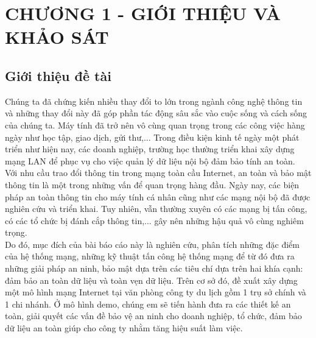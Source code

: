 \documentclass[a4paper, 12pt]{article}
\begin{document}
\section*{CHƯƠNG 1 - GIỚI THIỆU VÀ KHẢO SÁT}

\setcounter{section}{1}
\setcounter{subsection}{0}
\setcounter{figure}{0}
\setcounter{table}{0}
\subsection{Giới thiệu đề tài}
\hspace*{1cm}Chúng ta đã chứng kiến nhiều thay đổi to lớn trong ngành công nghệ thông tin và những thay đổi này đã góp phần tác động sâu sắc vào cuộc sống và cách sống của chúng ta. Máy tính đã trở nên vô cùng quan trọng trong các công việc hàng ngày như học tập, giao dịch, gửi thư,... Trong điều kiện kinh tế ngày một phát triển như hiện nay, các doanh nghiệp, trường học thường triển khai xây dựng mạng LAN để phục vụ cho việc quản lý dữ liệu nội bộ đảm bảo tính an toàn.\\
\hspace*{1cm}Với nhu cầu trao đổi thông tin trong mạng toàn cầu Internet, an toàn và bảo mật thông tin là một trong những vấn để quan trọng hàng đầu. Ngày nay, các biện pháp an toàn thông tin cho máy tính cá nhân cũng như các mạng nội bộ đã được nghiên cứu và triển khai. Tuy nhiên, vẫn thường xuyên có các mạng bị tấn công, có các tổ chức bị đánh cắp thông tin,... gây nên những hậu quả vô cùng nghiêm trọng.\\
\hspace*{1cm}Do đó, mục đích của bài báo cáo này là nghiên cứu, phân tích những đặc điểm của hệ thống mạng, những kỹ thuật tấn công hệ thống mạng để từ đó đưa ra những giải pháp an ninh, bảo mật dựa trên các tiêu chí dựa trên hai khía cạnh: đảm bảo an toàn dữ liệu và toàn vẹn dữ liệu. Trên cơ sở đó, đề xuất xây dựng một mô hình mạng Internet tại văn phòng công ty du lịch gồm 1 trụ sở chính và 1 chi nhánh. Ở mô hình demo, chúng em sẽ tiến hành đưa ra các thiết kế an toàn, giải quyết các vấn đề bảo vệ an ninh cho doanh nghiệp, tổ chức, đảm bảo dữ liệu an toàn giúp cho công ty nhằm tăng hiệu suất làm việc.
\end{document}
